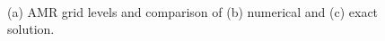 \documentclass[]{article}
\begin{document}
\begin{figure}[htpb!]
\centering
{}\\
\caption{(a) AMR grid levels and comparison of (b) numerical and (c) exact solution.} 
\label{fig:Comparison}
\end{figure}
\end{document}
